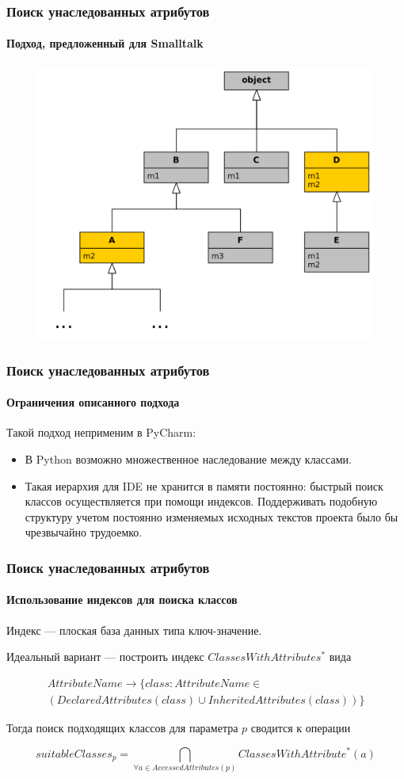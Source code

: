 \documentclass[handout]{beamer}
\begin{document}
\begin{frame}
  \frametitle{Поиск унаследованных атрибутов}
  \framesubtitle{Подход, предложенный для Smalltalk}

  \begin{figure}
    \begin{center}
      \includegraphics[width=0.6\linewidth]{fig/class-search-example.png}
    \end{center}
  \end{figure}
\end{frame}

\begin{frame}
  \frametitle{Поиск унаследованных атрибутов}
  \framesubtitle{Ограничения описанного подхода}

  Такой подход неприменим в PyCharm:
  \begin{itemize}
      \item В Python возможно множественное наследование между классами.

      \item Такая иерархия для IDE не хранится в памяти постоянно: быстрый поиск
        классов осуществляется при помощи индексов. Поддерживать подобную
        структуру учетом постоянно изменяемых исходных текстов проекта
        было бы чрезвычайно трудоемко.
  \end{itemize}
  
\end{frame}

\begin{frame}
  \frametitle{Поиск унаследованных атрибутов}
  \framesubtitle{Использование индексов для поиска классов}
  
  Индекс --- плоская база данных типа ключ-значение.

  Идеальный вариант --- построить индекс $ClassesWithAttributes^*$ вида

  \begin{multline*}
    AttributeName \rightarrow \{class: AttributeName \in \\
  (DeclaredAttributes(class) \cup InheritedAttributes(class)) \}
  \end{multline*}

  Тогда поиск подходящих классов для параметра $p$ сводится к операции

  \[
    suitableClasses_p = \bigcap\limits_{\forall{a} \in AccessedAttributes(p)}
    ClassesWithAttribute^*(a)
  \]
  
\end{frame}
\end{document}
